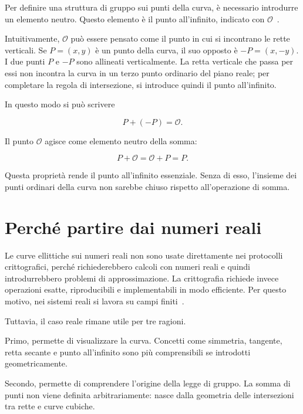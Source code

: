 \documentclass[12pt,a4paper,oneside]{report}
\begin{document}
Per definire una struttura di gruppo sui punti della curva, è necessario introdurre un elemento neutro. Questo elemento è il punto all'infinito, indicato con \(\mathcal{O}\)~\cite{margara_ec}.

Intuitivamente, \(\mathcal{O}\) può essere pensato come il punto in cui si incontrano le rette verticali. Se \(P=(x,y)\) è un punto della curva, il suo opposto è \(-P=(x,-y)\). I due punti \(P\) e \(-P\) sono allineati verticalmente. La retta verticale che passa per essi non incontra la curva in un terzo punto ordinario del piano reale; per completare la regola di intersezione, si introduce quindi il punto all'infinito.

In questo modo si può scrivere

\begin{equation}
    P + (-P) = \mathcal{O}.
\end{equation}

Il punto \(\mathcal{O}\) agisce come elemento neutro della somma:

\begin{equation}
    P + \mathcal{O} = \mathcal{O} + P = P.
\end{equation}

Questa proprietà rende il punto all'infinito essenziale. Senza di esso, l'insieme dei punti ordinari della curva non sarebbe chiuso rispetto all'operazione di somma.

\section{Perché partire dai numeri reali}

Le curve ellittiche sui numeri reali non sono usate direttamente nei protocolli crittografici, perché richiederebbero calcoli con numeri reali e quindi introdurrebbero problemi di approssimazione. La crittografia richiede invece operazioni esatte, riproducibili e implementabili in modo efficiente. Per questo motivo, nei sistemi reali si lavora su campi finiti~\cite{margara_ec}.

Tuttavia, il caso reale rimane utile per tre ragioni.

Primo, permette di visualizzare la curva. Concetti come simmetria, tangente, retta secante e punto all'infinito sono più comprensibili se introdotti geometricamente.

Secondo, permette di comprendere l'origine della legge di gruppo. La somma di punti non viene definita arbitrariamente: nasce dalla geometria delle intersezioni tra rette e curve cubiche.
\end{document}
